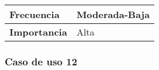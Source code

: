 \begin{longtable}{lll}
\textbf{Frecuencia}                              & \multicolumn{2}{l}{Moderada-Baja}                                                                                                                                                                                                            \\ \hline
\textbf{Importancia}                             & \multicolumn{2}{l}{Alta}                                                                                                                                                                                                                     \\ \hline
\end{longtable}

\subsubsection{Caso de uso 12}
